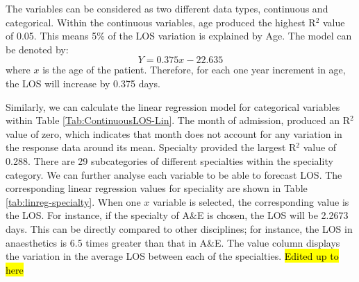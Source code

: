 \documentclass[../thesis.tex]{subfiles}
\begin{document}
The variables can be considered as two different data types, continuous and categorical. Within the continuous variables, age produced the highest R$^{2}$ value of 0.05. This means 5\% of the LOS variation is explained by Age. The model can be denoted by: 
\begin{equation}
    Y = 0.375x - 22.635
\end{equation}
where $x$ is the age of the patient.
Therefore, for each one year increment in age, the LOS will increase by 0.375 days.

Similarly, we can calculate the linear regression model for categorical variables within Table \ref{Tab:ContinuousLOS-Lin}. The month of admission, produced an R$^{2}$ value of zero, which indicates that month does not account for any variation in the response data around its mean. Specialty provided the largest R$^{2}$ value of 0.288. There are 29 subcategories of different specialties within the speciality category. We can further analyse each variable to be able to forecast LOS. The corresponding linear regression values for speciality are shown in Table \ref{tab:linreg-specialty}. When one $x$ variable is selected, the corresponding value is the LOS. For instance, if the specialty of A\&E is chosen, the LOS will be 2.2673 days. This can be directly compared to other disciplines; for instance, the LOS in anaesthetics is 6.5 times greater than that in A\&E. The value column displays the variation in the average LOS between each of the specialties.
\hl{Edited up to here}
\end{document}
